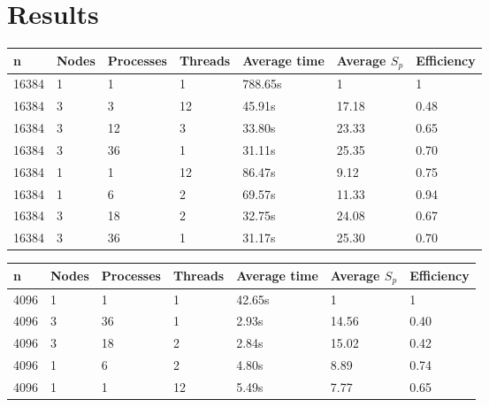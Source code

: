 \section{Results}

\begin{table}[H]
   \centering
    \begin{tabular}{| l | l | l | l | l | l | l |}
    \hline
    \bf{n} & \bf{Nodes} & \bf{Processes} &\bf{Threads} & \bf{Average time} & \bf{Average }$S_{p}$ & \bf{Efficiency} \\ \hline
    	16384 & 1 & 1 & 1 & 788.65s & 1 & 1 \\ \hline
	16384 & 3 & 3 & 12 & 45.91s & 17.18 & 0.48 \\ \hline
	16384 & 3 & 12 & 3 & 33.80s & 23.33 & 0.65 \\ \hline
	16384 & 3 & 36 & 1 & 31.11s & 25.35 & 0.70  \\ \hline
	16384 & 1 & 1 & 12 & 86.47s & 9.12 & 0.75 \\ \hline
	16384 & 1 & 6 & 2 & 69.57s & 11.33 & 0.94 \\ \hline
	16384 & 3 & 18 & 2 & 32.75s & 24.08 & 0.67 \\ \hline
	16384 & 3 & 36 & 1 & 31.17s & 25.30 & 0.70\\ \hline
    \end{tabular}
\end{table}

\begin{table}[H]
   \centering
    \begin{tabular}{| l | l | l | l | l | l | l |}
    \hline
    \bf{n} & \bf{Nodes} & \bf{Processes} &\bf{Threads} & \bf{Average time} & \bf{Average }$S_{p}$ & \bf{Efficiency} \\ \hline
	4096 & 1 & 1 & 1 & 42.65s & 1 & 1 \\ \hline
	4096 & 3 & 36 & 1 & 2.93s & 14.56 & 0.40 \\ \hline
	4096 & 3 & 18 & 2 & 2.84s & 15.02 & 0.42 \\ \hline
	4096 & 1 & 6 & 2 & 4.80s & 8.89 & 0.74 \\ \hline
	4096 & 1 & 1 & 12 & 5.49s & 7.77 & 0.65  \\ \hline
    \end{tabular}
\end{table}